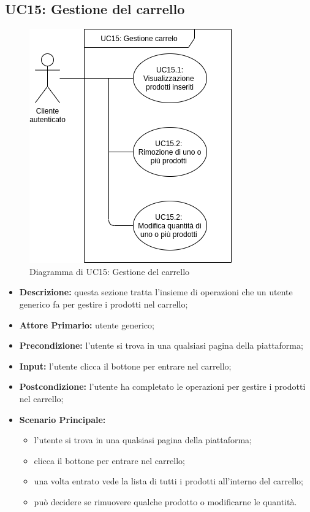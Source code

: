         \subsection{UC15: Gestione del carrello}
        \begin{figure}[!ht]
            \caption{Diagramma di UC15: Gestione del carrello}
            \vspace{10px}
            \includegraphics[scale=0.5]{../../../Images/AnalisiRequisiti/UC15}
            \centering
        \end{figure}
        \begin{itemize}
            \item \textbf{Descrizione:} questa sezione tratta l'insieme di operazioni che un utente generico fa per gestire i prodotti nel carrello;
            \item \textbf{Attore Primario:} utente generico;
            \item \textbf{Precondizione:} l'utente si trova in una qualsiasi pagina della piattaforma;
            \item \textbf{Input:} l'utente clicca il bottone per entrare nel carrello;
            \item \textbf{Postcondizione:} l'utente ha completato le operazioni per gestire i prodotti nel carrello;
            \item \textbf{Scenario Principale:}
                \begin{itemize}
                    \item l'utente si trova in una qualsiasi pagina della piattaforma;
                    \item clicca il bottone per entrare nel carrello;
                    \item una volta entrato vede la lista di tutti i prodotti all'interno del carrello;
                    \item può decidere se rimuovere qualche prodotto o modificarne le quantità.
                \end{itemize}
        \end{itemize}
